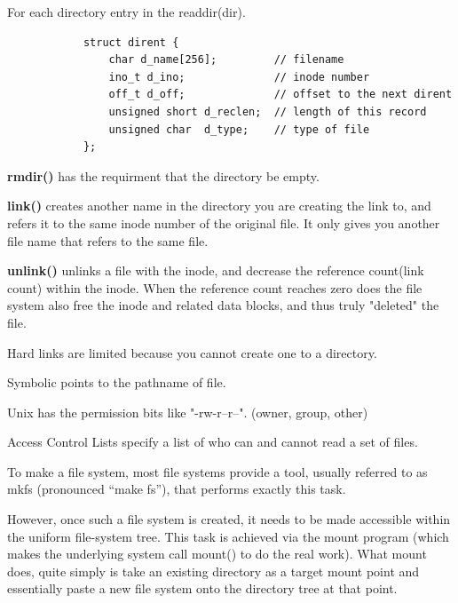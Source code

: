         For each directory entry in the readdir(dir).

        \begin{lstlisting}
            struct dirent {
                char d_name[256];         // filename
                ino_t d_ino;              // inode number
                off_t d_off;              // offset to the next dirent
                unsigned short d_reclen;  // length of this record
                unsigned char  d_type;    // type of file
            };
        \end{lstlisting}

        \textbf{rmdir()} has the requirment that the directory be empty.


        \textbf{link()} creates another name in the directory you are creating the link to,
        and refers it to the same inode number of the original file. It only gives you another 
        file name that refers to the same file.

        \textbf{unlink()} unlinks a file with the inode, and decrease the reference count(link count)
        within the inode. When the reference count reaches zero does the file 
        system also free the inode and related data blocks, and thus truly "deleted" the file.


        Hard links are limited because you cannot create one to a directory.

        Symbolic points to the pathname of file.


        Unix has the permission bits like "-rw-r--r--". (owner, group, other)


        Access Control Lists specify a list of who can and cannot read a set of files.


    To make a file system, most file systems provide a tool, 
    usually referred to as mkfs (pronounced “make fs”), that performs exactly this task.

    
    However, once such a file system is created, 
    it needs to be made accessible within the uniform file-system tree. 
    This task is achieved via the mount program 
    (which makes the underlying system call mount() to do the real work). 
    What mount does,
    quite simply is take an existing directory as a target mount point 
    and essentially paste a new file system onto the directory tree at that point.

